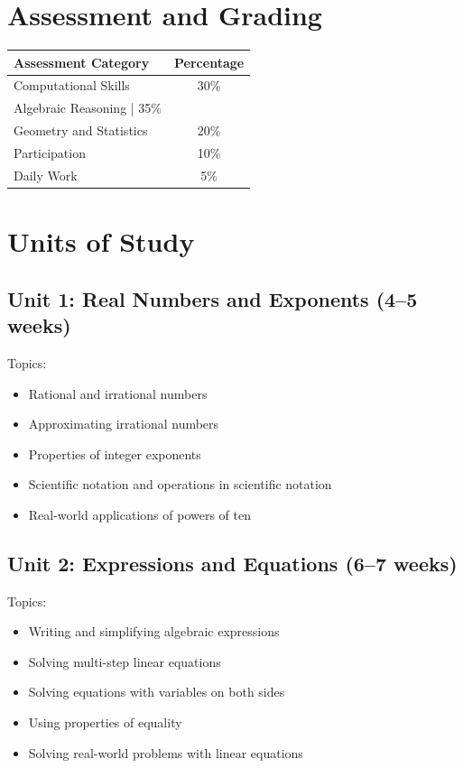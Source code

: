 \documentclass[11pt,letterpaper]{report}
\begin{document}
\section{Assessment and Grading}

\begin{center}
\begin{tabular}{|l|c|}
\hline
\textbf{Assessment Category} & \textbf{Percentage} \\
\hline
Computational Skills & 30\% \\
\hline
Algebraic Reasoning | 35\% \\
\hline
Geometry and Statistics & 20\% \\
\hline
Participation & 10\% \\
\hline
Daily Work & 5\% \\
\hline
\end{tabular}
\end{center}

\section{Units of Study}

\subsection{Unit 1: Real Numbers and Exponents (4–5 weeks)}

Topics:
\begin{itemize}
\item Rational and irrational numbers
\item Approximating irrational numbers
\item Properties of integer exponents
\item Scientific notation and operations in scientific notation
\item Real-world applications of powers of ten
\end{itemize}

\subsection{Unit 2: Expressions and Equations (6–7 weeks)}

Topics:
\begin{itemize}
\item Writing and simplifying algebraic expressions
\item Solving multi-step linear equations
\item Solving equations with variables on both sides
\item Using properties of equality
\item Solving real-world problems with linear equations
\end{itemize}
\end{document}
